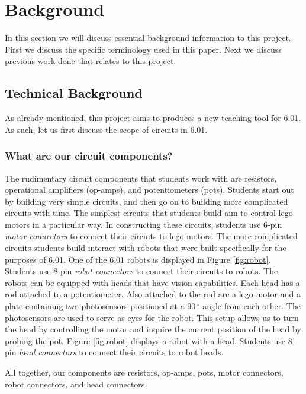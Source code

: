 
\chapter{Background}
\label{ch:background}

In this section we will discuss essential background information to this project.
First we discuss the specific terminology used in this paper. Next we discuss
previous work done that relates to this project.

\section{Technical Background}

As already mentioned, this project aims to produces a new teaching tool for
6.01. As such, let us first discuss the scope of circuits in 6.01.

\subsection{What are our circuit components?}

The rudimentary circuit components that students work with are resistors,
operational amplifiers (op-amps), and potentiometers (pots). Students start out
by building very simple circuits, and then go on to building
more complicated circuits with time. The simplest circuits that students build
aim to control lego motors in a particular way. In constructing these circuits,
students use $6$-pin \textit{motor connectors} to connect their circuits to
lego motors.
The more complicated circuits students build interact with robots that were
built specifically for the purposes of 6.01. One of the 6.01 robots is displayed
in Figure \ref{fig:robot}. Students use $8$-pin \textit{robot connectors} to
connect their circuits to robots. The robots can be equipped with heads that have
vision capabilities. Each head has a rod attached to a potentiometer. Also attached
to the rod are a lego motor and a plate containing two photosensors positioned
at a $90\,^{\circ}$ angle from each other. The
photosensors are used to serve as eyes for the robot. This setup allows us to
turn the head by controlling the motor and inquire the current position of the
head by probing the pot. Figure \ref{fig:robot} displays a robot with a head.
Students use $8$-pin \textit{head connectors} to connect their circuits to
robot heads.

All together, our components are resistors, op-amps, pots, motor connectors,
robot connectors, and head connectors.

